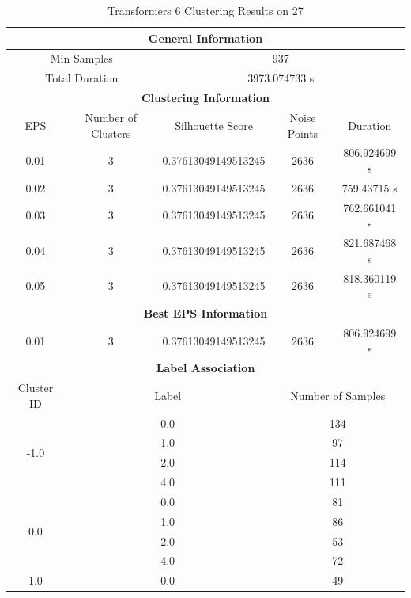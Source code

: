 \begin{longtable}{|c|c|c|c|c|}
\caption{Transformers 6 Clustering Results on 27} \label{tab:27_transformers_6_clustering_results}\\
\hline
\multicolumn{5}{|c|}{\textbf{General Information}} \\
\hline
\multicolumn{2}{|c|}{Min Samples} & \multicolumn{3}{c|}{937} \\
\multicolumn{2}{|c|}{Total Duration} & \multicolumn{3}{c|}{3973.074733 s} \\
\hline
\multicolumn{5}{|c|}{\textbf{Clustering Information}} \\
\hline
EPS & Number of Clusters & Silhouette Score & Noise Points & Duration \\
0.01 & 3 & 0.37613049149513245 & 2636 & 806.924699 s\\
0.02 & 3 & 0.37613049149513245 & 2636 & 759.43715 s\\
0.03 & 3 & 0.37613049149513245 & 2636 & 762.661041 s\\
0.04 & 3 & 0.37613049149513245 & 2636 & 821.687468 s\\
0.05 & 3 & 0.37613049149513245 & 2636 & 818.360119 s\\
\hline
\multicolumn{5}{|c|}{\textbf{Best EPS Information}} \\
\hline
0.01 & 3 & 0.37613049149513245 & 2636 & 806.924699 s\\
\hline
\multicolumn{5}{|c|}{\textbf{Label Association}} \\
\hline
Cluster ID & \multicolumn{2}{c|}{Label} & \multicolumn{2}{c|}{Number of Samples} \\
\hline
\multirow{4}{*}{-1.0} & \multicolumn{2}{c|}{0.0} & \multicolumn{2}{c|}{134} \\
& \multicolumn{2}{c|}{1.0} & \multicolumn{2}{c|}{97} \\
& \multicolumn{2}{c|}{2.0} & \multicolumn{2}{c|}{114} \\
& \multicolumn{2}{c|}{4.0} & \multicolumn{2}{c|}{111} \\
\hline
\multirow{4}{*}{0.0} & \multicolumn{2}{c|}{0.0} & \multicolumn{2}{c|}{81} \\
& \multicolumn{2}{c|}{1.0} & \multicolumn{2}{c|}{86} \\
& \multicolumn{2}{c|}{2.0} & \multicolumn{2}{c|}{53} \\
& \multicolumn{2}{c|}{4.0} & \multicolumn{2}{c|}{72} \\
\hline
\multirow{4}{*}{1.0} & \multicolumn{2}{c|}{0.0} & \multicolumn{2}{c|}{49} \\

\end{longtable}

